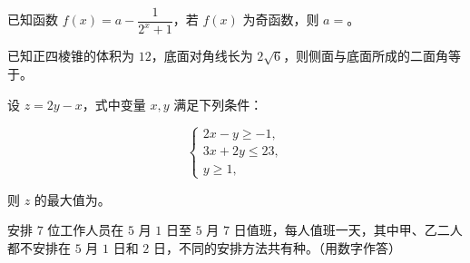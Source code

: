 \begin{question}
已知函数 $f(x)=a-\dfrac1{2^x+1}$，若 $f(x)$ 为奇函数，则 $a=$\gkblank{}。

\end{question}
\begin{question}
已知正四棱锥的体积为 $12$，底面对角线长为 $2\sqrt6$，则侧面与底面所成的二面角等于\gkblank{}。

\end{question}
\begin{question}
设 $z=2y-x$，式中变量 $x,y$ 满足下列条件：

\nopagebreak[4]
\[
\begin{cases}
2x-y\geqslant-1,\\
3x+2y\leqslant23,\\
y\geqslant1,
\end{cases}
\]

则 $z$ 的最大值为\gkblank{}。

\end{question}
\begin{question}
安排 $7$ 位工作人员在 $5$ 月 $1$ 日至 $5$ 月 $7$ 日值班，每人值班一天，其中甲、乙二人都不安排在 $5$ 月 $1$ 日和 $2$ 日，不同的安排方法共有\gkblank{}种。（用数字作答）

\end{question}

